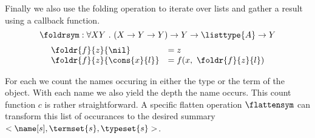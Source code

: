 \begin{definition}[\foldrsym]
  Finally we also use the folding operation to iterate over lists and gather a result using a callback function.
  \[ \foldrsym : \forall X Y ~.~ (X \rightarrow Y \rightarrow Y) \rightarrow Y \rightarrow \listtype{A} \rightarrow Y \]
  \[ \begin{array}{ll}
      \foldr{f}{z}{\nil} & = z \\
      \foldr{f}{z}{\cons{x}{l}} & = f(x,~ \foldr{f}{z}{l})
    \end{array}\]
\end{definition}

For each \coqobj[s] we count the names occuring in either the type or the term of the object.
With each name we also yield the depth the name occurs.
This count function $c$ is rather straightforward.
A specific flatten operation $\flattensym$ can transform this list of occurances to the desired summary $<\name[s], \termset{s}, \typeset{s}>$.

